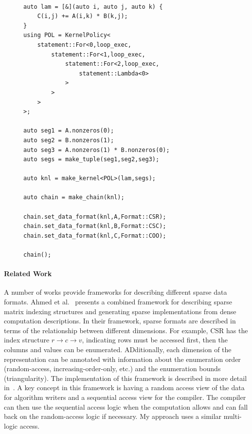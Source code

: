 \documentclass{article}
\begin{document}
\begin{figure}
\begin{lstlisting}[caption={Possible RAJA implementation of Sparse Matrix Multiply.}, label={SparseMMRaja}]
    
auto lam = [&](auto i, auto j, auto k) {
    C(i,j) += A(i,k) * B(k,j);
}
using POL = KernelPolicy<
    statement::For<0,loop_exec,
        statement::For<1,loop_exec,
            statement::For<2,loop_exec,
                statement::Lambda<0>
            >
        >
    >
>;

auto seg1 = A.nonzeros(0);
auto seg2 = B.nonzeros(1);
auto seg3 = A.nonzeros(1) * B.nonzeros(0);
auto segs = make_tuple(seg1,seg2,seg3);

auto knl = make_kernel<POL>(lam,segs);

auto chain = make_chain(knl);

chain.set_data_format(knl,A,Format::CSR);
chain.set_data_format(knl,B,Format::CSC);
chain.set_data_format(knl,C,Format::COO);

chain();

\end{lstlisting}
\end{figure}








\paragraph{Related Work}

A number of works provide frameworks for describing different sparse data formats. 
Ahmed et al.~\cite{ahmed2000framework} presents a combined framework for describing sparse matrix indexing structures and generating sparse implementations from dense computation descriptions.
In their framework, sparse formats are described in terms of the relationship between different dimensions. For example, CSR has the index structure $r \rightarrow c \rightarrow v$, indicating rows must be accessed first, then the columns and values can be enumerated.
ADditionally, each dimension of the representation can be annotated with information about the enumeration order (random-access, increasing-order-only, etc.) and the enumeration bounds (triangularity).
The implementation of this framework is described in more detail in~\cite{mateev2000next}.
A key concept in this framework is having a random access view of the data for algorithm writers and a sequential access view for the compiler.
The compiler can then use the sequential access logic when the computation allows and can fall back on the random-access logic if necessary. 
My approach uses a similar multi-logic access.
\end{document}
